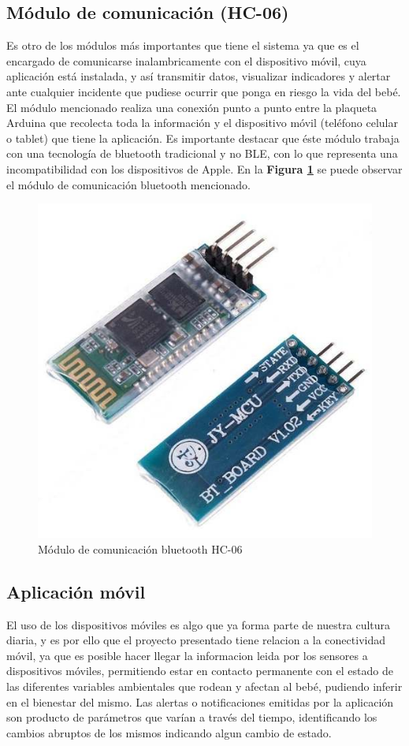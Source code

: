 \documentclass{IEEEtran}
\begin{document}
		\subsection{Módulo de comunicación (\textbf{HC-06})}

			Es otro de los módulos más importantes que tiene el sistema ya que es el encargado de comunicarse inalambricamente con el dispositivo móvil, cuya aplicación está instalada, y así transmitir datos, visualizar indicadores y alertar ante cualquier incidente que pudiese ocurrir que ponga en riesgo la vida del bebé. El módulo mencionado realiza una conexión punto a punto entre la plaqueta Arduina que recolecta toda la información y el dispositivo móvil (teléfono celular o tablet) que tiene la aplicación. Es importante destacar que éste módulo trabaja con una tecnología de bluetooth tradicional y no BLE, con lo que representa una incompatibilidad con los dispositivos de Apple. En la \textbf{Figura \ref{arduino-modulo-bluetooth}} se puede observar el módulo de comunicación bluetooth mencionado.

			\begin{figure}
				\centering
				\includegraphics[width=0.5\linewidth]{arduino-modulo-bluetooth}
				\caption{Módulo de comunicación bluetooth HC-06}
				\label{arduino-modulo-bluetooth}
			\end{figure}

		\subsection{Aplicación móvil}
		
			El uso de los dispositivos móviles es algo que ya forma parte de nuestra cultura diaria, y es por ello que el proyecto presentado tiene relacion a la conectividad móvil, ya que es posible hacer llegar la informacion leida por los sensores a dispositivos móviles, permitiendo estar en contacto permanente con el estado de las diferentes variables ambientales que rodean y afectan al bebé, pudiendo inferir en el bienestar del mismo. Las alertas o notificaciones emitidas por la aplicación son producto de parámetros que varían a través del tiempo, identificando los cambios abruptos de los mismos indicando algun cambio de estado. 
			
\end{document}
